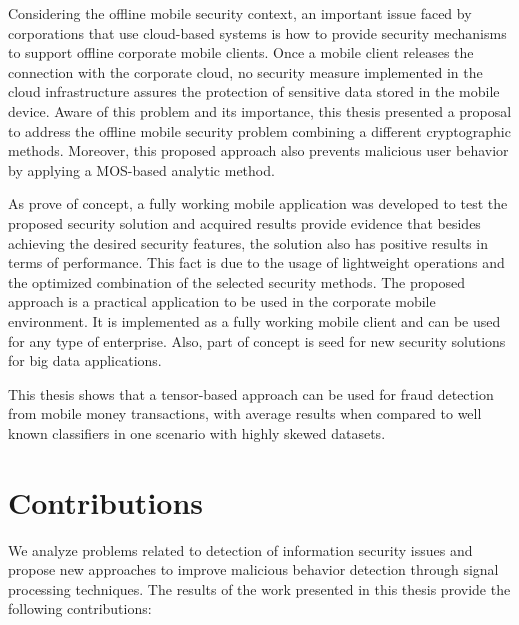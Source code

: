 Considering the offline mobile security context, an important issue faced by corporations that use cloud-based systems is how to provide security mechanisms to support offline corporate mobile clients. Once a mobile client releases the connection with the corporate cloud, no security measure implemented in the cloud infrastructure assures the protection of sensitive data stored in the mobile device. Aware of this problem and its importance, this thesis presented a proposal to address the offline mobile security problem combining a different cryptographic methods. Moreover, this proposed approach also prevents malicious user behavior by applying a MOS-based analytic method. 

As prove of concept, a fully working mobile application was developed to test the proposed security solution and acquired results provide evidence that besides achieving the desired security features, the solution also has positive results in terms of performance. This fact is due to the usage of lightweight operations and the optimized combination of the selected security methods. The proposed approach is a practical application to be used in the corporate mobile environment. It is implemented as a fully working mobile client and can be used for any type of enterprise. Also, part of concept is seed for new security solutions for big data applications. 

This thesis shows that a tensor-based approach can be used for fraud detection from mobile money transactions, with average results when compared to well known classifiers in one scenario with highly skewed datasets.


\section{Contributions}
\label{sc:conc_contributions}

We analyze problems related to detection of information security issues and propose new approaches to improve malicious behavior detection through signal processing techniques. The results of the work presented in this thesis provide the following contributions:

